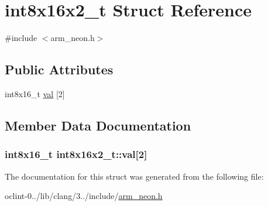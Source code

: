 \hypertarget{structint8x16x2__t}{\section{int8x16x2\-\_\-t Struct Reference}
\label{structint8x16x2__t}
}


{\ttfamily \#include $<$arm\-\_\-neon.\-h$>$}

\subsection*{Public Attributes}
\begin{DoxyCompactItemize}
\item 
int8x16\-\_\-t \hyperlink{structint8x16x2__t_a835a7037621369cf3d4091a316d1c7b9}{val} \mbox{[}2\mbox{]}
\end{DoxyCompactItemize}


\subsection{Member Data Documentation}
\hypertarget{structint8x16x2__t_a835a7037621369cf3d4091a316d1c7b9}{
\subsubsection[{val}]{\setlength{\rightskip}{0pt plus 5cm}int8x16\-\_\-t int8x16x2\-\_\-t\-::val\mbox{[}2\mbox{]}}}\label{structint8x16x2__t_a835a7037621369cf3d4091a316d1c7b9}


The documentation for this struct was generated from the following file\-:\begin{DoxyCompactItemize}
\item 
oclint-\/0../lib/clang/3../include/\hyperlink{arm__neon_8h}{arm\-\_\-neon.\-h}\end{DoxyCompactItemize}
